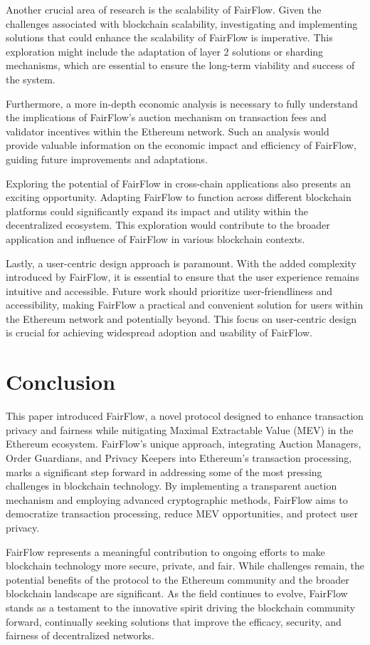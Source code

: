 \documentclass{article}
\begin{document}
Another crucial area of research is the scalability of FairFlow. Given the challenges associated with blockchain scalability, investigating and implementing solutions that could enhance the scalability of FairFlow is imperative. This exploration might include the adaptation of layer 2 solutions or sharding mechanisms, which are essential to ensure the long-term viability and success of the system.

Furthermore, a more in-depth economic analysis is necessary to fully understand the implications of FairFlow’s auction mechanism on transaction fees and validator incentives within the Ethereum network. Such an analysis would provide valuable information on the economic impact and efficiency of FairFlow, guiding future improvements and adaptations.

Exploring the potential of FairFlow in cross-chain applications also presents an exciting opportunity. Adapting FairFlow to function across different blockchain platforms could significantly expand its impact and utility within the decentralized ecosystem. This exploration would contribute to the broader application and influence of FairFlow in various blockchain contexts.

Lastly, a user-centric design approach is paramount. With the added complexity introduced by FairFlow, it is essential to ensure that the user experience remains intuitive and accessible. Future work should prioritize user-friendliness and accessibility, making FairFlow a practical and convenient solution for users within the Ethereum network and potentially beyond. This focus on user-centric design is crucial for achieving widespread adoption and usability of FairFlow.

\section{Conclusion}

This paper introduced FairFlow, a novel protocol designed to enhance transaction privacy and fairness while mitigating Maximal Extractable Value (MEV) in the Ethereum ecosystem. FairFlow's unique approach, integrating Auction Managers, Order Guardians, and Privacy Keepers into Ethereum's transaction processing, marks a significant step forward in addressing some of the most pressing challenges in blockchain technology. By implementing a transparent auction mechanism and employing advanced cryptographic methods, FairFlow aims to democratize transaction processing, reduce MEV opportunities, and protect user privacy.

FairFlow represents a meaningful contribution to ongoing efforts to make blockchain technology more secure, private, and fair. While challenges remain, the potential benefits of the protocol to the Ethereum community and the broader blockchain landscape are significant. As the field continues to evolve, FairFlow stands as a testament to the innovative spirit driving the blockchain community forward, continually seeking solutions that improve the efficacy, security, and fairness of decentralized networks.



\end{document}
